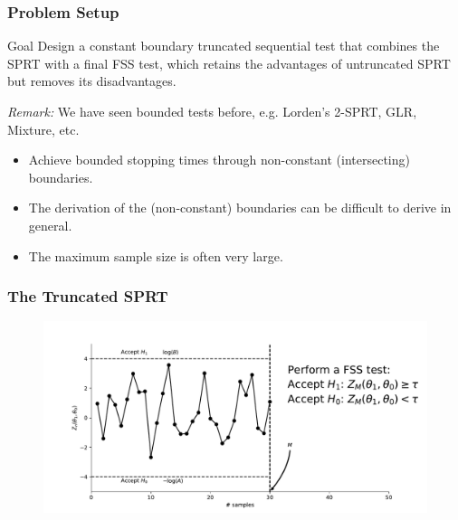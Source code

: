 \documentclass[10pt]{beamer}
\begin{document}
\begin{frame}
\frametitle{Problem Setup}

\begin{block}{Goal}
Design a constant boundary truncated sequential test that combines the SPRT with a final FSS test, which retains the advantages of untruncated SPRT but removes its disadvantages.
\end{block}

\textit{Remark:} We have seen bounded tests before, e.g. Lorden's 2-SPRT, GLR, Mixture, etc.
\begin{itemize}
\item Achieve bounded stopping times through non-constant (intersecting) boundaries.
\item The derivation of the (non-constant) boundaries can be difficult to derive in general.
\item The maximum sample size is often very large.
\end{itemize}

\end{frame}

\begin{frame}
\frametitle{The Truncated SPRT}

\begin{figure}
\centering
\includegraphics[width=\textwidth]{images/truncated_sprt}
\end{figure}

\end{frame}
\end{document}

